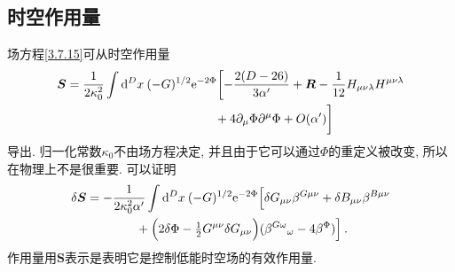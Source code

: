 \subsection*{时空作用量}

场方程\eqref{3.7.15}可从时空作用量
	\begin{align}
		\bm{S}&=\frac{1}{2 \kappa_{0}^{2}} \int \mathrm{d}^{D} x\: (-G)^{1 / 2} \mathrm{e}^{-2 \Phi} \biggl[- \frac{2(D-26)}{3 \alpha^{\prime}}+\bm{R}-\frac{1}{12} H_{\mu \nu \lambda} H^{\mu \nu \lambda}  \nonumber \\
		&\qquad\qquad\qquad\qquad \qquad\qquad+4 \partial_{\mu} \Phi \partial^{\mu} \Phi+O(\alpha^{\prime})\biggr]  \label{3.7.20}
	\end{align}
导出. 归一化常数$\kappa_0$不由场方程决定, 并且由于它可以通过$\Phi$的重定义被改变, 所以在物理上不是很重要. 可以证明
\begin{align}
\delta \bm{S}&=-\frac{1}{2 \kappa_{0}^{2} \alpha^{\prime}} \int \mathrm{d}^{D} x\: (-G)^{1 / 2} \mathrm{e}^{-2 \Phi} \Bigl[\delta G_{\mu \nu} \beta^{G \mu \nu}+\delta B_{\mu \nu} \beta^{B \mu \nu} \nonumber \\
&\qquad \qquad +\Bigl(2 \delta \Phi-\tfrac{1}{2} G^{\mu \nu} \delta G_{\mu \nu}\Bigr) (\beta^{G \omega}{}_{\omega}-4 \beta^{\Phi})\Bigr] \:. \label{3.7.21}
\end{align}
作用量用$\bm{S}$表示是表明它是控制低能时空场的有效作用量. 

